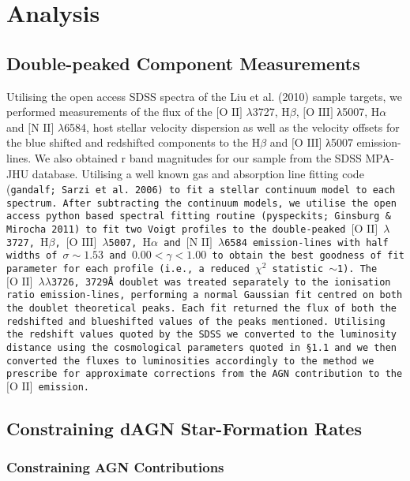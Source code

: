 \section{Analysis}

\subsection{Double-peaked Component Measurements}

Utilising the open access SDSS spectra of the Liu et al. (2010) sample targets, we performed measurements of the flux of the $\text{[O II]}$ $\lambda$3727, $\text{H}\beta$, $\text{[O III]}$ λ5007, $\text{H}\alpha$ and $\text{[N II]}$ $\lambda$6584, host stellar velocity dispersion as well as the velocity offsets for the blue shifted and redshifted components to the $\text{H}\beta$ and $\text{[O III]}$ λ5007 emission-lines. We also obtained r band magnitudes for our sample from the SDSS MPA-JHU database. Utilising a well known gas and absorption line fitting code (\tt{gandalf}; Sarzi et al. 2006) to fit a stellar continuum model to each spectrum. After subtracting the continuum models, we utilise the open access python based spectral fitting routine (\tt{pyspeckits}; Ginsburg \& Mirocha 2011) to fit two Voigt profiles to the double-peaked $\text{[O II]}$ $\lambda$3727, $\text{H}\beta$, $\text{[O III]}$ $\lambda$5007, $\text{H}\alpha$ and $\text{[N II]}$ $\lambda$6584 emission-lines with half widths of $\sigma\sim{1.53}$ and ${0.00}<{\gamma}<{1.00}$ to obtain the best goodness of fit parameter for each profile (i.e., a reduced $\chi^{2}$ statistic $\sim$1). The $\text{[O II]}$ $\lambda\lambda$3726, 3729{\AA} doublet was treated separately to the ionisation ratio emission-lines, performing a normal Gaussian fit centred on both the doublet theoretical peaks. Each fit returned the flux of both the redshifted and blueshifted values of the peaks mentioned. Utilising the redshift values quoted by the SDSS we converted to the luminosity distance using the cosmological parameters quoted in §1.1 and we then converted the fluxes to luminosities accordingly to the method we prescribe for approximate corrections from the AGN contribution to the $\text{[O II]}$ emission.

\subsection{Constraining dAGN Star-Formation Rates}
\subsubsection{Constraining AGN Contributions}

